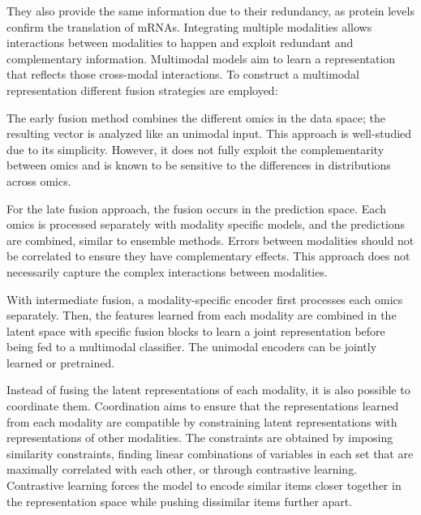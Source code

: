\documentclass[../main.tex]{subfiles}
\begin{document}
		They also provide the same information due to their redundancy, as protein levels confirm the translation of mRNAs.
		Integrating multiple modalities allows interactions between modalities to happen and exploit redundant and complementary information.
		Multimodal models aim to learn a representation that reflects those cross-modal interactions.
		To construct a multimodal representation different fusion strategies are employed:
		\begin{description}[%
				style=multiline,
				leftmargin=!,
				labelwidth=2.5cm,
			]
			\item[Early fusion]
				The early fusion method combines the different omics in the data space; the resulting vector is analyzed like an unimodal input.
				This approach is well-studied due to its simplicity.
				However, it does not fully exploit the complementarity between omics and is known to be sensitive to the differences in distributions across omics.
			\item[Late fusion]
				For the late fusion approach, the fusion occurs in the prediction space.
				Each omics is processed separately with modality specific models, and the predictions are combined, similar to ensemble methods.
				Errors between modalities should not be correlated to ensure they have complementary effects.
				This approach does not necessarily capture the complex interactions between modalities.
			\item[Intermediate fusion]
				With intermediate fusion, a modality-specific encoder first processes each omics separately.
				Then, the features learned from each modality are combined in the latent space with specific fusion blocks to learn a joint representation before being fed to a multimodal classifier.
				The unimodal encoders can be jointly learned or pretrained.
		\end{description}
		Instead of fusing the latent representations of each modality, it is also possible to coordinate them.
		Coordination aims to ensure that the representations learned from each modality are compatible by constraining latent representations with representations of other modalities.
		The constraints are obtained by imposing similarity constraints, finding linear combinations of variables in each set that are maximally correlated with each other, or through contrastive learning.
		Contrastive learning forces the model to encode similar items closer together in the representation space while pushing dissimilar items further apart.
\end{document}
